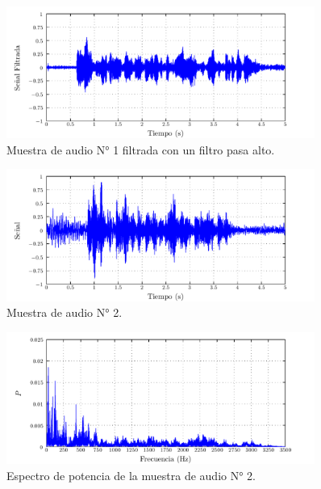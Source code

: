 \documentclass[a4paper,12pt,final]{article}
\begin{document}
      \begin{figure}[H]
        \begin{center}
          \caption{Muestra de audio N° 1 filtrada con un filtro pasa alto.}
          \label{p2f3}
          \vspace{-1em}
          \includegraphics[width=0.9\textwidth]{./laboratorio_5/problema02_sample01_highpass_filtered_signal.pdf}
        \end{center}
      \end{figure}
      \vfill

      \newpage
      \begin{figure}[H]
        \begin{center}
          \caption{Muestra de audio N° 2.}
          \label{p2f4}
          \vspace{-1em}
          \includegraphics[width=0.9\textwidth]{./laboratorio_5/problema02_sample02_signal.pdf}
        \end{center}
      \end{figure}

      \begin{figure}[H]
        \begin{center}
          \caption{Espectro de potencia de la muestra de audio N° 2.}
          \label{p2f5}
          \vspace{-1em}
          \includegraphics[width=0.9\textwidth]{./laboratorio_5/problema02_sample02_power_spectrum.pdf}
        \end{center}
      \end{figure}
\end{document}
